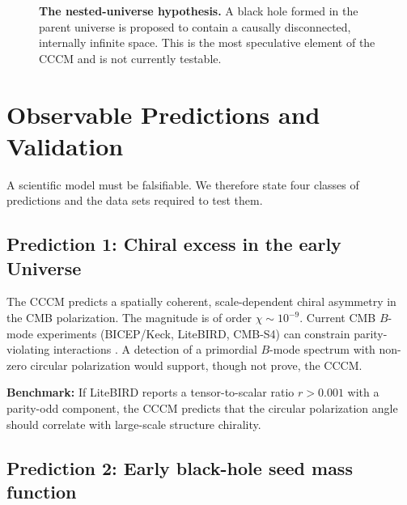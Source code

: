 \documentclass[a4paper,11pt]{article}
\newcommand{\CCCM}{CCCM}
\begin{document}
\begin{figure}[htbp]
\centering
{}
\caption{\textbf{The nested-universe hypothesis.} A black hole formed in the parent universe is proposed to contain a causally disconnected, internally infinite space. This is the most speculative element of the \CCCM{} and is not currently testable.}
\label{fig:nested}
\end{figure}

\section{Observable Predictions and Validation}
\label{sec:predictions}

A scientific model must be falsifiable. We therefore state four classes of predictions and the data sets required to test them.

\subsection{Prediction 1: Chiral excess in the early Universe}

The \CCCM{} predicts a spatially coherent, scale-dependent chiral asymmetry in the CMB polarization. The magnitude is of order $\chi \sim 10^{-9}$. Current CMB $B$-mode experiments (BICEP/Keck, LiteBIRD, CMB-S4) can constrain parity-violating interactions \citep{Matsumura2023}. A detection of a primordial $B$-mode spectrum with non-zero circular polarization would support, though not prove, the \CCCM.

\textbf{Benchmark:} If LiteBIRD reports a tensor-to-scalar ratio $r > 0.001$ with a parity-odd component, the \CCCM{} predicts that the circular polarization angle should correlate with large-scale structure chirality.

\subsection{Prediction 2: Early black-hole seed mass function}
\end{document}
